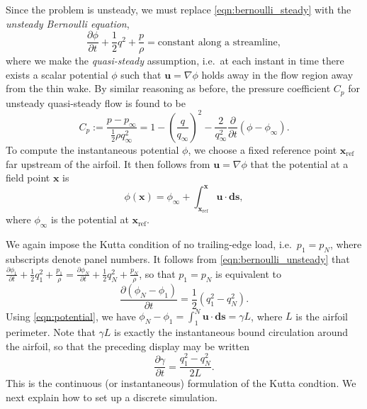 \documentclass[10pt]{article}
\newcommand\defn[1]{\emph{#1}}
\newcommand\pd[2]{\frac{\partial{#1}}{\partial{#2}}}
\def\ie{i.e.~}
\begin{document}
Since the problem is unsteady, we must replace \eqref{eqn:bernoulli_steady} with the \defn{unsteady Bernoulli equation},
\begin{equation}\label{eqn:bernoulli_unsteady}
\pd{\phi}{t} + \frac{1}{2}q^2+\frac{p}{\rho}=\text{constant along a streamline},
\end{equation}
where we make the \defn{quasi-steady} assumption, \ie at each instant in time there exists a scalar potential $\phi$ such that $\mathbf u=\nabla\phi$ holds away in the flow region away from the thin wake.  By similar reasoning as before, the pressure coefficient $C_p$ for unsteady quasi-steady flow is found to be
\[C_p:=\frac{p-p_\infty}{\frac{1}{2}\rho q_\infty^2}=1-\left(\frac{q}{q_\infty}\right)^2-\frac{2}{q_\infty^2}\pd{}{t}(\phi-\phi_\infty).\]
To compute the instantaneous potential $\phi$, we choose a fixed reference point $\mathbf x_\text{ref}$ far upstream of the airfoil.  It then follows from $\mathbf u=\nabla\phi$ that the potential at a field point $\mathbf x$ is
\begin{equation}\label{eqn:potential}
\phi(\mathbf x) = \phi_\infty + \int_{\mathbf x_\text{ref}}^{\mathbf x}\mathbf u\cdot\mathbf{ds},
\end{equation}
where $\phi_\infty$ is the potential at $\mathbf x_\text{ref}$.

We again impose the Kutta condition of no trailing-edge load, \ie $p_1=p_N$, where subscripts denote panel numbers.  It follows from \eqref{eqn:bernoulli_unsteady} that $\pd{\phi_1}{t}+\frac{1}{2}q_1^2+\frac{p_1}{\rho}=\pd{\phi_N}{t}+\frac{1}{2}q_N^2+\frac{p_N}{\rho}$, so that $p_1=p_N$ is equivalent to \[\pd{(\phi_N-\phi_1)}{t}=\frac{1}{2}(q_1^2-q_N^2).\]  Using \eqref{eqn:potential}, we have $\phi_N-\phi_1=\int_1^N\mathbf u\cdot\mathbf{ds}=\gamma L$, where $L$ is the airfoil perimeter.  Note that $\gamma L$ is exactly the instantaneous bound circulation around the airfoil, so that the preceding display may be written \[\pd\gamma t=\frac{q_1^2-q_N^2}{2L}.\]  This is the continuous (or instantaneous) formulation of the Kutta condtion.  We next explain how to set up a discrete simulation.


\end{document}
